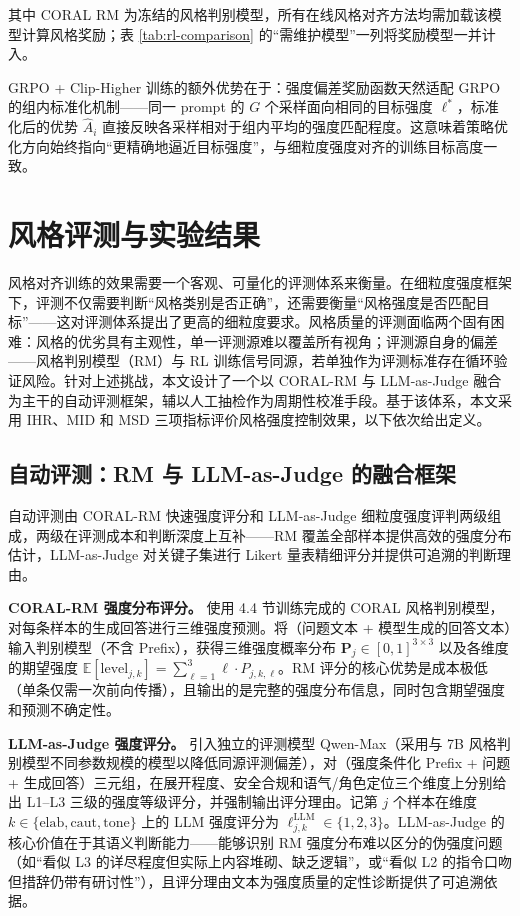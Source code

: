 \documentclass[fontset=fandol,type=master,campus=shenzhen,etitleauto=true]{hithesisbook}
\begin{document}
其中 CORAL RM 为冻结的风格判别模型，所有在线风格对齐方法均需加载该模型计算风格奖励；表 \ref{tab:rl-comparison} 的“需维护模型”一列将奖励模型一并计入。

GRPO + Clip-Higher 训练的额外优势在于：强度偏差奖励函数天然适配 GRPO 的组内标准化机制------同一 prompt 的 $G$ 个采样面向相同的目标强度 $\ell^*$，标准化后的优势 $\hat{A}_i$ 直接反映各采样相对于组内平均的强度匹配程度。这意味着策略优化方向始终指向``更精确地逼近目标强度''，与细粒度强度对齐的训练目标高度一致。

\section{风格评测与实验结果}\label{ux98ceux683cux8bc4ux6d4bux4f53ux7cfb}

风格对齐训练的效果需要一个客观、可量化的评测体系来衡量。在细粒度强度框架下，评测不仅需要判断``风格类别是否正确''，还需要衡量``风格强度是否匹配目标''------这对评测体系提出了更高的细粒度要求。风格质量的评测面临两个固有困难：风格的优劣具有主观性，单一评测源难以覆盖所有视角；评测源自身的偏差------风格判别模型（RM）与 RL 训练信号同源，若单独作为评测标准存在循环验证风险。针对上述挑战，本文设计了一个以 CORAL-RM 与 LLM-as-Judge 融合为主干的自动评测框架，辅以人工抽检作为周期性校准手段。基于该体系，本文采用 IHR、MID 和 MSD 三项指标评价风格强度控制效果，以下依次给出定义。

\subsection{自动评测：RM 与 LLM-as-Judge 的融合框架}\label{ux81eaux52a8ux8bc4ux6d4b}

自动评测由 CORAL-RM 快速强度评分和 LLM-as-Judge 细粒度强度评判两级组成，两级在评测成本和判断深度上互补------RM 覆盖全部样本提供高效的强度分布估计，LLM-as-Judge 对关键子集进行 Likert 量表精细评分并提供可追溯的判断理由。

\textbf{CORAL-RM 强度分布评分。} 使用 4.4 节训练完成的 CORAL 风格判别模型，对每条样本的生成回答进行三维强度预测。将（问题文本 + 模型生成的回答文本）输入判别模型（不含 Prefix），获得三维强度概率分布 $\mathbf{P}_j \in [0,1]^{3 \times 3}$ 以及各维度的期望强度 $\mathbb{E}[\text{level}_{j,k}] = \sum_{\ell=1}^{3} \ell \cdot P_{j,k,\ell}$。RM 评分的核心优势是成本极低（单条仅需一次前向传播），且输出的是完整的强度分布信息，同时包含期望强度和预测不确定性。

\textbf{LLM-as-Judge 强度评分。} 引入独立的评测模型 Qwen-Max（采用与 7B 风格判别模型不同参数规模的模型以降低同源评测偏差），对（强度条件化 Prefix + 问题 + 生成回答）三元组，在展开程度、安全合规和语气/角色定位三个维度上分别给出 L1--L3 三级的强度等级评分，并强制输出评分理由。记第 $j$ 个样本在维度 $k \in \{\text{elab}, \text{caut}, \text{tone}\}$ 上的 LLM 强度评分为 $\ell_{j,k}^{\text{LLM}} \in \{1,2,3\}$。LLM-as-Judge 的核心价值在于其语义判断能力------能够识别 RM 强度分布难以区分的伪强度问题（如``看似 L3 的详尽程度但实际上内容堆砌、缺乏逻辑''，或``看似 L2 的指令口吻但措辞仍带有研讨性''），且评分理由文本为强度质量的定性诊断提供了可追溯依据。
\end{document}
